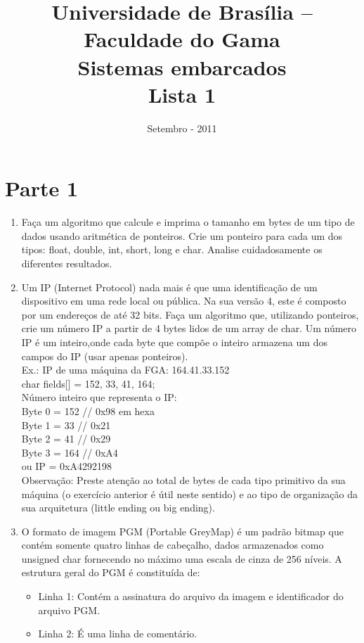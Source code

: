 \documentclass[a4paper,10pt]{article}
\title{ \textbf{Universidade de Brasília -- Faculdade do Gama \\ Sistemas embarcados \\ Lista 1 }}
\date{Setembro - 2011}
\begin{document}
\maketitle

\section{Parte 1}
\begin{enumerate}
 \item Faça um algoritmo que calcule e imprima o tamanho em bytes de um tipo de dados usando aritmética de ponteiros. Crie um ponteiro para cada 
      um dos tipos: float, double, int, short, long e char. Analise cuidadosamente os diferentes resultados.
 \item Um IP (Internet Protocol) nada mais é que uma identificação de um dispositivo em uma rede local ou pública. Na sua versão 4, este é composto 
      por um endereços de até 32 bits. Faça um algoritmo que, utilizando ponteiros, crie um número IP a partir de 4 bytes lidos de um array de char. 
      Um número IP é um inteiro,onde cada byte que compõe o inteiro armazena um dos campos do IP (usar apenas ponteiros).\\
      Ex.: IP de uma máquina da FGA: 164.41.33.152\\
	  char fields[] = {152, 33, 41, 164};\\
	  Número inteiro que representa o IP:\\
	  Byte 0 = 152 // 0x98 em hexa\\
	  Byte 1 = 33 // 0x21\\
	  Byte 2 = 41 // 0x29\\
	  Byte 3 = 164 // 0xA4\\
	  ou IP = 0xA4292198\\
      Observação: Preste atenção ao total de bytes de cada tipo primitivo da sua máquina (o exercício anterior é útil neste sentido) e ao tipo de 
      organização da sua arquitetura (little ending ou big ending).
 \item O formato de imagem PGM (Portable GreyMap) é um padrão bitmap que contém somente quatro linhas de cabeçalho, dados armazenados como unsigned 
      char fornecendo no máximo uma escala de cinza de 256 níveis. A estrutura geral do PGM é constituída de:\\
      \begin{itemize}
       \item Linha 1: Contém a assinatura do arquivo da imagem e identificador do arquivo PGM.
       \item Linha 2: É uma linha de comentário.

\end{itemize}
\end{enumerate}
\end{document}
